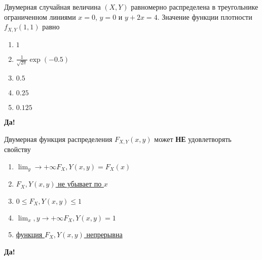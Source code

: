 \documentclass[t]{beamer}
\begin{document}
 \begin{frame} \label{2-Yes} 
\begin{block}{2} 

Двумерная случайная величина $(X, Y)$ равномерно распределена в треугольнике ограниченном линиями $x=0$, $y=0$ и $y+2x=4$. Значение функции плотности $f_{X,Y}(1,1)$ равно
  


 \end{block} 
\begin{enumerate} 
\item[] \hyperlink{2-No}{\beamergotobutton{} $1$}
\item[] \hyperlink{2-No}{\beamergotobutton{} $\frac{1}{\sqrt{2\pi}}\exp(-0.5)$}
\item[] \hyperlink{2-No}{\beamergotobutton{} $0.5$}
\item[] \hyperlink{2-Yes}{\beamergotobutton{} $0.25$}
\item[] \hyperlink{2-No}{\beamergotobutton{} $0.125$}
\end{enumerate} 

 \textbf{Да!} 
 \hyperlink{3}{}\end{frame} 


 \begin{frame} \label{3-Yes} 
\begin{block}{3} 

  Двумерная функция распределения $F_{X,Y}(x,y)$ может \textbf{НЕ} удовлетворять свойству
  


 \end{block} 
\begin{enumerate} 
\item[] \hyperlink{3-No}{\beamergotobutton{} $\lim_y \to +\infty F_X,Y(x,y) = F_X(x)$}
\item[] \hyperlink{3-Yes}{\beamergotobutton{} $F_X,Y(x,y)$ не убывает по $x$}
\item[] \hyperlink{3-No}{\beamergotobutton{} $0 \leq F_X,Y(x, y)\leq 1$}
\item[] \hyperlink{3-No}{\beamergotobutton{} $\lim_x,y \to +\infty F_X,Y(x,y) = 1$}
\item[] \hyperlink{3-No}{\beamergotobutton{} функция $F_X,Y(x, y)$ непрерывна}
\end{enumerate} 

 \textbf{Да!} 
 \hyperlink{4}{}\end{frame} 
\end{document}
